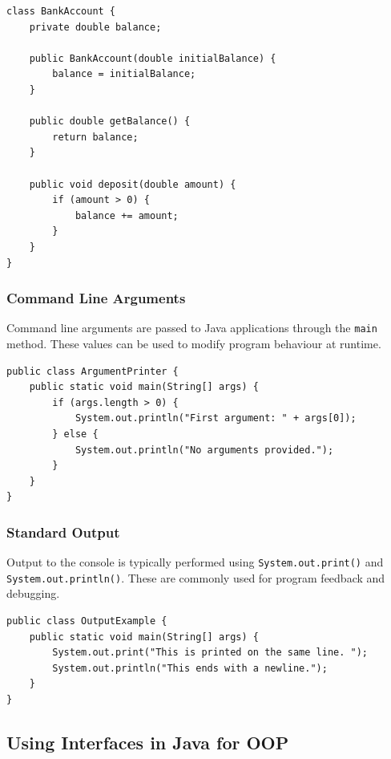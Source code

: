 \documentclass{article}
\newcommand{\codecmd}[1]{\textcolor[rgb]{0,0.5,0}{\texttt{#1}}}
\begin{document}
\begin{verbatim}
class BankAccount {
    private double balance;

    public BankAccount(double initialBalance) {
        balance = initialBalance;
    }

    public double getBalance() {
        return balance;
    }

    public void deposit(double amount) {
        if (amount > 0) {
            balance += amount;
        }
    }
}
\end{verbatim}

\subsubsection{Command Line Arguments}

Command line arguments are passed to Java applications through the \codecmd{main} method. These values can be used to modify program behaviour at runtime.

\begin{verbatim}
public class ArgumentPrinter {
    public static void main(String[] args) {
        if (args.length > 0) {
            System.out.println("First argument: " + args[0]);
        } else {
            System.out.println("No arguments provided.");
        }
    }
}
\end{verbatim}

\subsubsection{Standard Output}

Output to the console is typically performed using \codecmd{System.out.print()} and \codecmd{System.out.println()}. These are commonly used for program feedback and debugging.

\begin{verbatim}
public class OutputExample {
    public static void main(String[] args) {
        System.out.print("This is printed on the same line. ");
        System.out.println("This ends with a newline.");
    }
}
\end{verbatim}


\subsection{Using Interfaces in Java for OOP}
\label{subsec:interfaces}
\end{document}
